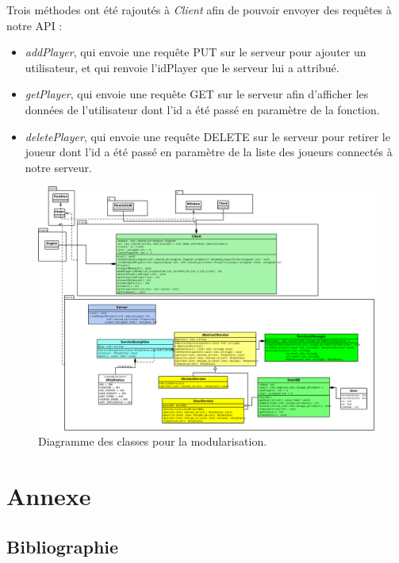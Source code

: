 \documentclass[a4paper,12pt]{article}
\begin{document}
    Trois méthodes ont été rajoutés à \emph{Client} afin de pouvoir envoyer des requêtes à notre API : \begin{itemize}
        \item \emph{addPlayer}, qui envoie une requête PUT sur le serveur pour ajouter un utilisateur, et qui renvoie l'idPlayer que le serveur lui a attribué.
        \item \emph{getPlayer}, qui envoie une requête GET sur le serveur afin d'afficher les données de l'utilisateur dont l'id a été passé en paramètre de la fonction.
        \item \emph{deletePlayer}, qui envoie une requête DELETE sur le serveur pour retirer le joueur dont l'id a été passé en paramètre de la liste des joueurs connectés à notre serveur.
    \end{itemize}
    
    \begin{landscape}
    \begin{figure}[p]
    \includegraphics[width=0.8\paperheight]{module.png}
    \caption{\label{uml:module}Diagramme des classes pour la modularisation.}
    \end{figure}
    \end{landscape}
    
    \clearpage
    \section{Annexe}
    \label{sec:Annexe}
    \subsection{Bibliographie}

    
\end{document}
